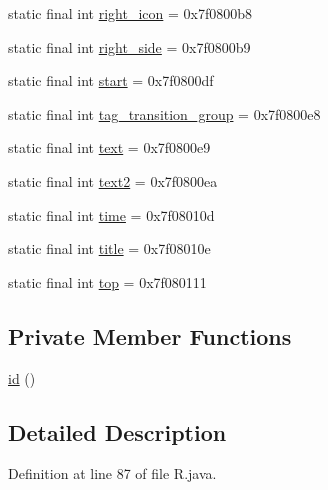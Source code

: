 \begin{DoxyCompactItemize}
\item 
static final int \mbox{\hyperlink{classandroid_1_1support_1_1fragment_1_1_r_1_1id_a84be6ee7a00f1c86ac4b3bbeafbbf062}{right\+\_\+icon}} = 0x7f0800b8
\item 
static final int \mbox{\hyperlink{classandroid_1_1support_1_1fragment_1_1_r_1_1id_a6c6229b22fccfc6575c602456877e7f0}{right\+\_\+side}} = 0x7f0800b9
\item 
static final int \mbox{\hyperlink{classandroid_1_1support_1_1fragment_1_1_r_1_1id_a2d344efe69cba66141e91e91672565c3}{start}} = 0x7f0800df
\item 
static final int \mbox{\hyperlink{classandroid_1_1support_1_1fragment_1_1_r_1_1id_a71f552683eb16534008bbb886f1ebe6a}{tag\+\_\+transition\+\_\+group}} = 0x7f0800e8
\item 
static final int \mbox{\hyperlink{classandroid_1_1support_1_1fragment_1_1_r_1_1id_af59b862fcc030e013eeddbf37fad26c8}{text}} = 0x7f0800e9
\item 
static final int \mbox{\hyperlink{classandroid_1_1support_1_1fragment_1_1_r_1_1id_ac3ed7c283f93c713879d757672ced902}{text2}} = 0x7f0800ea
\item 
static final int \mbox{\hyperlink{classandroid_1_1support_1_1fragment_1_1_r_1_1id_a1ad4e0c77b0ba200bf2a633388897aae}{time}} = 0x7f08010d
\item 
static final int \mbox{\hyperlink{classandroid_1_1support_1_1fragment_1_1_r_1_1id_a796ac9208dc3433c3ab2d7a45f9f35fb}{title}} = 0x7f08010e
\item 
static final int \mbox{\hyperlink{classandroid_1_1support_1_1fragment_1_1_r_1_1id_a610fdd324f3b197216391211c720d444}{top}} = 0x7f080111
\end{DoxyCompactItemize}
\subsection*{Private Member Functions}
\begin{DoxyCompactItemize}
\item 
\mbox{\hyperlink{classandroid_1_1support_1_1fragment_1_1_r_1_1id_a0c961d0bbdd4953713b06273a10ee8bf}{id}} ()
\end{DoxyCompactItemize}


\subsection{Detailed Description}


Definition at line 87 of file R.\+java.



